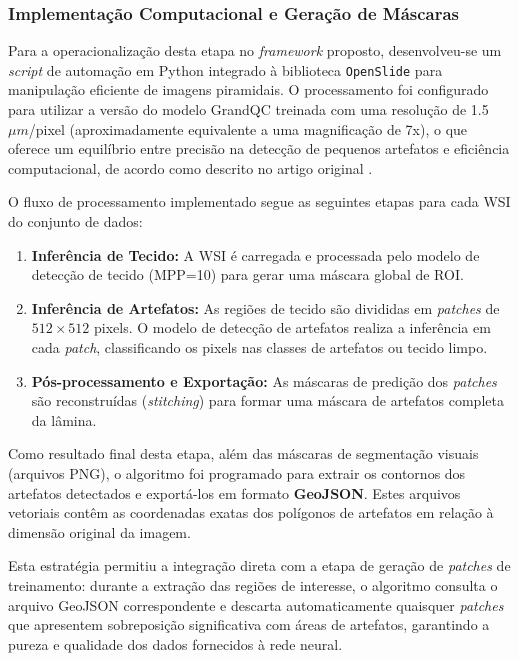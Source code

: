 \subsubsection{Implementação Computacional e Geração de Máscaras}

Para a operacionalização desta etapa no \textit{framework} proposto, desenvolveu-se um \textit{script} de automação em Python integrado à biblioteca \texttt{OpenSlide} \cite{OpenSlide} para manipulação eficiente de imagens piramidais. O processamento foi configurado para utilizar a versão do modelo GrandQC treinada com uma resolução de 1.5 $\mu m$/pixel (aproximadamente equivalente a uma magnificação de 7x), o que oferece um equilíbrio entre precisão na detecção de pequenos artefatos e eficiência computacional, de acordo como descrito no artigo original \cite{Weng2024GrandQC}.

O fluxo de processamento implementado segue as seguintes etapas para cada WSI do conjunto de dados:

\begin{enumerate}
    \item \textbf{Inferência de Tecido:} A WSI é carregada e processada pelo modelo de detecção de tecido (MPP=10) para gerar uma máscara global de ROI.
    \item \textbf{Inferência de Artefatos:} As regiões de tecido são divididas em \textit{patches} de $512 \times 512$ pixels. O modelo de detecção de artefatos realiza a inferência em cada \textit{patch}, classificando os pixels nas classes de artefatos ou tecido limpo.
    \item \textbf{Pós-processamento e Exportação:} As máscaras de predição dos \textit{patches} são reconstruídas (\textit{stitching}) para formar uma máscara de artefatos completa da lâmina.
\end{enumerate}

Como resultado final desta etapa, além das máscaras de segmentação visuais (arquivos PNG), o algoritmo foi programado para extrair os contornos dos artefatos detectados e exportá-los em formato \textbf{GeoJSON}. Estes arquivos vetoriais contêm as coordenadas exatas dos polígonos de artefatos em relação à dimensão original da imagem. 

Esta estratégia permitiu a integração direta com a etapa de geração de \textit{patches} de treinamento: durante a extração das regiões de interesse, o algoritmo consulta o arquivo GeoJSON correspondente e descarta automaticamente quaisquer \textit{patches} que apresentem sobreposição significativa com áreas de artefatos, garantindo a pureza e qualidade dos dados fornecidos à rede neural.


